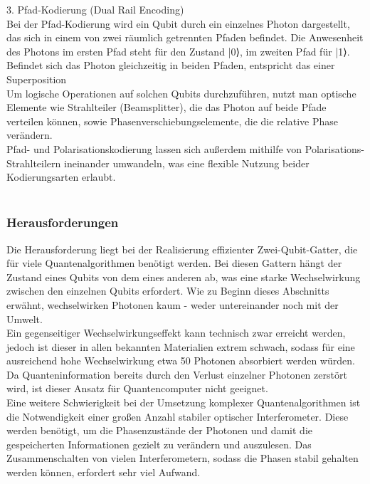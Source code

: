 3. Pfad-Kodierung (Dual Rail Encoding)\\
Bei der Pfad-Kodierung wird ein Qubit durch ein einzelnes Photon dargestellt, das sich in einem von zwei räumlich getrennten Pfaden befindet. Die Anwesenheit des Photons im ersten Pfad steht für den Zustand |0⟩, im zweiten Pfad für |1⟩. Befindet sich das Photon gleichzeitig in beiden Pfaden, entspricht das einer Superposition\\

Um logische Operationen auf solchen Qubits durchzuführen, nutzt man optische Elemente wie Strahlteiler (Beamsplitter), die das Photon auf beide Pfade verteilen können, sowie Phasenverschiebungselemente, die die relative Phase verändern. \\

Pfad- und Polarisationskodierung lassen sich außerdem mithilfe von Polarisations-Strahlteilern ineinander umwandeln, was eine flexible Nutzung beider Kodierungsarten erlaubt.  \cite{nielsen_quantum_2010}\\\\

\subsubsection{Herausforderungen}
Die Herausforderung liegt bei der Realisierung effizienter Zwei-Qubit-Gatter, die für viele Quantenalgorithmen benötigt werden. Bei diesen Gattern hängt der Zustand eines Qubits von dem eines anderen ab, was eine starke Wechselwirkung zwischen den einzelnen Qubits erfordert. Wie zu Beginn dieses Abschnitts erwähnt, wechselwirken Photonen kaum - weder untereinander noch mit der Umwelt. \\
Ein gegenseitiger Wechselwirkungseffekt kann technisch zwar erreicht werden, jedoch ist dieser in allen bekannten Materialien extrem schwach, sodass für eine ausreichend hohe Wechselwirkung etwa 50 Photonen absorbiert werden würden. Da Quanteninformation bereits durch den Verlust einzelner Photonen zerstört wird, ist dieser Ansatz für Quantencomputer nicht geeignet. \\

Eine weitere Schwierigkeit bei der Umsetzung komplexer Quantenalgorithmen ist die Notwendigkeit einer großen Anzahl stabiler optischer Interferometer. Diese werden benötigt, um die Phasenzustände der Photonen und damit die gespeicherten Informationen gezielt zu verändern und auszulesen. Das Zusammenschalten von vielen Interferometern, sodass die Phasen stabil gehalten werden können, erfordert sehr viel Aufwand. \\

